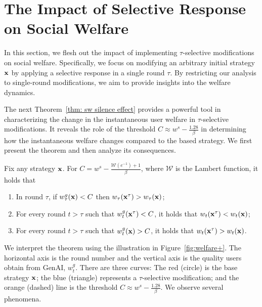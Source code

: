 \section{The Impact of Selective Response on Social Welfare}  \label{sec: welfare} 
In this section, we flesh out the impact of implementing $\tau$-selective modifications on social welfare. Specifically, we focus on modifying an arbitrary initial strategy ${\bf{x}}$ by applying a selective response in a single round $\tau$. By restricting our analysis to single-round modifications, we aim to provide insights into the welfare dynamics.

The next Theorem~\ref{thm: sw silence effect} provides a powerful tool in characterizing the change in the instantaneous user welfare in $\tau$-selective modifications. It reveals the role of the threshold $C \approx w^s -\frac{1.28}{\beta}$ in determining how the instantaneous welfare changes compared to the based strategy. We first present the theorem and then analyze its consequences. 
\begin{theorem} \label{thm: sw silence effect} 
Fix any strategy ${\bf{x}}$. For $C =w^s -\frac{\mathcal{W}(e^{-1}) + 1}{\beta}$, where $\mathcal{W}$ is the Lambert function, it holds that
\begin{enumerate}  
\item\label{thm-p1} In round $\tau$, if $w^g_\tau({\bf{x}}) < C$ then $w_\tau({\bf{x}}^\tau) > w_\tau({\bf{x}})$;
\item\label{thm-p2} For every round $t > \tau$ such that $w^g_t({\bf{x}}^\tau) < C$, it holds that $w_t({\bf{x}}^\tau) < w_t({\bf{x}})$;
\item\label{thm-p3} For every round $t > \tau$ such that $w^g_t({\bf{x}}) > C$, it holds that $w_t({\bf{x}}^\tau) > w_t({\bf{x}})$.  
\end{enumerate}  
\end{theorem}  
We interpret the theorem using the illustration in Figure~\ref{fig:welfare+}. The horizontal axis is the round number and the vertical axis is the quality users obtain from GenAI, $w^g_t$. There are three curves: The red (circle) is the base strategy ${\bf{x}}$; the blue (triangle) represents a $\tau$-selective modification; and the orange (dashed) line is the threshold $C \approx w^s -\frac{1.28}{\beta}$. We observe several phenomena.

